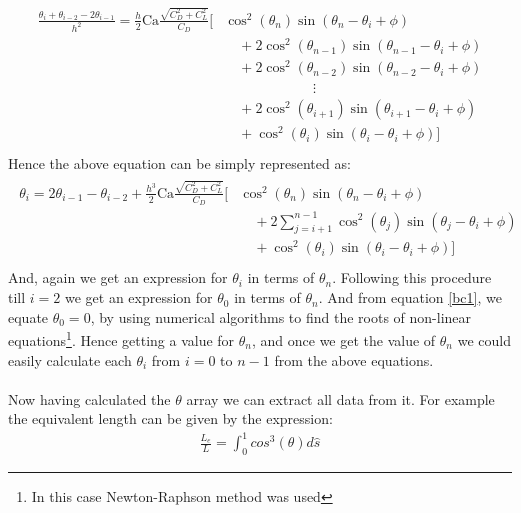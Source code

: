 \documentclass[a4paper,12pt]{report}
\begin{document}
\begin{align}
\begin{split}
\frac{\theta_{i}+\theta_{i-2}-2\theta_{i-1}}{h^2} =\frac{h}{2}\text{Ca}\frac{\sqrt{C_D^2+C_L^2}}{C_D}\Bigr[&\cos^2(\theta_n)\sin\left(\theta_n - \theta_{i}+\phi\right) \\
&\quad+2\cos^2(\theta_{n-1})\sin\left(\theta_{n-1} - \theta_{i}+\phi\right)\\
&\quad+2\cos^2(\theta_{n-2})\sin\left(\theta_{n-2} - \theta_{i}+\phi\right)\\
&\quad \phantom{{} = Giridhar}\vdots\\
&\quad+2\cos^2(\theta_{i+1})\sin\left(\theta_{i+1} - \theta_{i}+\phi\right)\\
&\quad+\cos^2(\theta_i)\sin\left(\theta_{i} - \theta_{i}+\phi\right)\Bigr]\\
\end{split}
\end{align}
Hence the above equation can be simply represented as:
\begin{align}
\begin{split}
\theta_{i} =2\theta_{i-1}-\theta_{i-2}+\frac{h^3}{2}\text{Ca}\frac{\sqrt{C_D^2+C_L^2}}{C_D}\Bigr[&\cos^2(\theta_n)\sin\left(\theta_n - \theta_{i}+\phi\right) \\
&\quad+2\sum_{j=i+1}^{n-1}\cos^2(\theta_{j})\sin\left(\theta_{j} - \theta_{i}+\phi\right)\\
&\quad+\cos^2(\theta_i)\sin\left(\theta_{i} - \theta_{i}+\phi\right)\Bigr]\\
\end{split}
\end{align}
And, again we get an expression for $\theta_i$ in terms of $\theta_n$. Following this procedure till $i=2$ we get an expression for $\theta_0$  in terms of $\theta_n$. And from equation \eqref{bc1}, we equate $\theta_0 = 0$, by using numerical algorithms to find the roots of non-linear equations\footnote{In this case Newton-Raphson method was used}. Hence getting a value for $\theta_n$, and once we get the value of $\theta_n$ we could easily calculate each $\theta_i$ from $i=0$ to $n-1$ from the above equations.\\
\hfill\\
Now having calculated the $\theta$ array we can extract all data from it. For example the equivalent length can be given by the expression:
\begin{align}
\frac{L_e}{L} = \int_0^1cos^3(\theta)d\hat{s}
\end{align}
\end{document}
